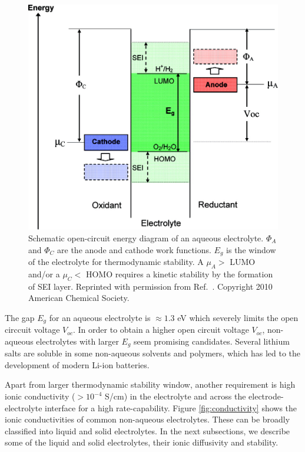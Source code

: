 \documentclass[../main.tex]{subfiles}
\begin{document}
\begin{figure}
    \centering
    \includegraphics{figures/electrolyte.jpeg}
    \caption{Schematic open-circuit energy diagram of an aqueous electrolyte. $\Phi_{A}$ and $\Phi_{C}$ are the anode and cathode work functions. $E_{g}$ is the window of the electrolyte for thermodynamic stability. A $\mu_{A}>$ LUMO and/or a $\mu_{C}<$ HOMO requires a kinetic stability by the formation of SEI layer. Reprinted with permission from Ref.~. Copyright 2010 American Chemical Society.}
    \label{fig:electrolyte}
\end{figure}

The gap $E_g$ for an aqueous electrolyte is $ \approx 1.3 $  eV which severely limits the open circcuit voltage $V_{oc}$. In order to obtain a higher open circuit voltage $V_{oc}$, non-aqueous electrolytes with larger $E_g$ seem promising candidates. Several lithium salts are soluble in some non-aqueous solvents and polymers, which has led to the development of modern Li-ion batteries.

Apart from larger thermodynamic stability window, another requirement is high ionic conductivity ($>10^{-4}$ S/cm) in the electrolyte and across the electrode-electrolyte interface for a high rate-capability. Figure \ref{fig:conductivity} shows the ionic conductivities of common non-aqueous electrolytes.\cite{Kamaya2011} These can be broadly classified into liquid and solid electrolytes. In the next subsections, we describe some of the liquid and solid electrolytes, their ionic diffusivity and stability.
\end{document}
